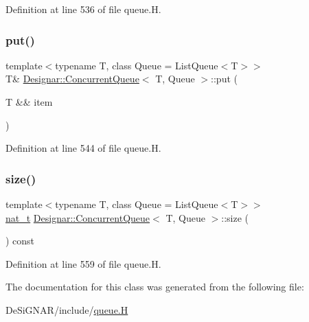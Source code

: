Definition at line 536 of file queue.\+H.

\mbox{\label{class_designar_1_1_concurrent_queue_aacc6c771061780c42058303f300b5acb}} 
\subsubsection{\texorpdfstring{put()}{put()}\hspace{0.1cm}{\footnotesize\ttfamily [2/2]}}
{\footnotesize\ttfamily template$<$typename T, class Queue = List\+Queue$<$\+T$>$$>$ \\
T\& \hyperlink{class_designar_1_1_concurrent_queue}{Designar\+::\+Concurrent\+Queue}$<$ T, Queue $>$\+::put (\begin{DoxyParamCaption}\item[{T \&\&}]{item }\end{DoxyParamCaption})\hspace{0.3cm}{\ttfamily [inline]}}



Definition at line 544 of file queue.\+H.

\mbox{\label{class_designar_1_1_concurrent_queue_acbeaea381f53471ea17366ab7a5fc52d}} 
\subsubsection{\texorpdfstring{size()}{size()}}
{\footnotesize\ttfamily template$<$typename T, class Queue = List\+Queue$<$\+T$>$$>$ \\
\hyperlink{namespace_designar_aa72662848b9f4815e7bf31a7cf3e33d1}{nat\+\_\+t} \hyperlink{class_designar_1_1_concurrent_queue}{Designar\+::\+Concurrent\+Queue}$<$ T, Queue $>$\+::size (\begin{DoxyParamCaption}{ }\end{DoxyParamCaption}) const\hspace{0.3cm}{\ttfamily [inline]}}



Definition at line 559 of file queue.\+H.



The documentation for this class was generated from the following file\+:\begin{DoxyCompactItemize}
\item 
De\+Si\+G\+N\+A\+R/include/\hyperlink{queue_8_h}{queue.\+H}\end{DoxyCompactItemize}
